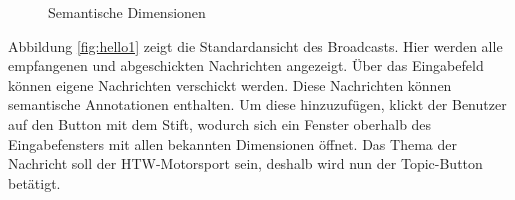 \begin{minipage}{0.47\linewidth}
	\begin{figure}[H]
		\centering
		\caption{Semantische Dimensionen}
		\label{fig:hello2}
	\end{figure}
\end{minipage}
\newpage
Abbildung \ref{fig:hello1} zeigt die Standardansicht des Broadcasts. Hier werden alle empfangenen und abgeschickten Nachrichten angezeigt. Über das Eingabefeld können eigene Nachrichten verschickt werden. Diese Nachrichten können semantische Annotationen enthalten. Um diese hinzuzufügen, klickt der Benutzer auf den Button mit dem Stift, wodurch sich ein Fenster oberhalb des Eingabefensters mit allen bekannten Dimensionen öffnet. Das Thema der Nachricht soll der HTW-Motorsport sein, deshalb wird nun der Topic-Button betätigt. \newline
